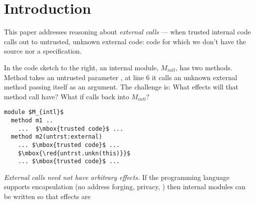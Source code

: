 



\section{Introduction}
\label{s:intro}


This paper addresses reasoning about \emph{external calls} --- when
trusted internal code calls out to untrusted, unknown external code:
% 
code for which we don't have the source  nor a specification.

 

\noindent
\begin{minipage}{.55\textwidth}
In the code sketch to the right, 
an internal module, $M_{intl}$, has two methods. %
Method  takes an untrusted parameter ,
at line 6 it calls an unknown external method  passing itself as an argument. 
The challenge is: %
What effects will that method call have?
What if  calls back into $M_{intl}$? %
\end{minipage}
\hfill
\begin{minipage}{.4\textwidth}
\begin{lstlisting}[mathescape=true, language=Chainmail,frame=none]
module $M_{intl}$        
  method m1 ..
    ...  $\mbox{trusted code}$ ...  
  method m2(untrst:external) 
    ... $\mbox{trusted code}$ ...
    $\mbox{\red{untrst.unkn(this)}}$   
    ... $\mbox{trusted code}$ ...
\end{lstlisting}
\end{minipage}

 
 {\em{External calls  need not have  arbitrary   effects.}}
If the programming language supports encapsulation (\eg no address forging, privacy,
 \etc) then internal modules can be  written %
so  that effects are  %

